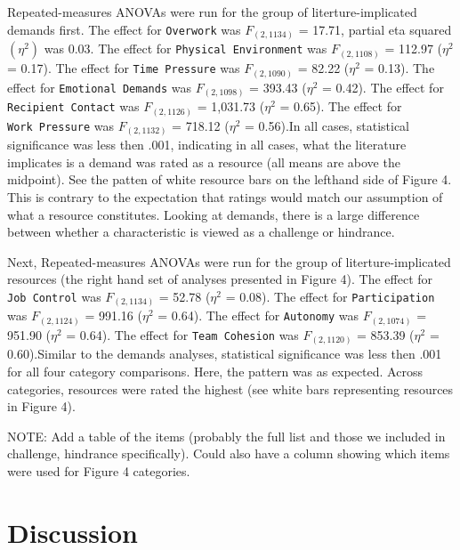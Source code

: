 \documentclass[
  english,
  man]{apa6}
\begin{document}
Repeated-measures ANOVAs were run for the group of literture-implicated demands first. The effect for \texttt{Overwork} was \(F_{(2, 1134)}\) = 17.71, partial eta squared \((\eta^2)\) was 0.03.
The effect for \texttt{Physical\ Environment} was \(F_{(2, 1108)}\) = 112.97 (\(\eta^2\) = 0.17).
The effect for \texttt{Time\ Pressure} was \(F_{(2, 1090)}\) = 82.22 (\(\eta^2\) = 0.13).
The effect for \texttt{Emotional\ Demands} was \(F_{(2, 1098)}\) = 393.43 (\(\eta^2\) = 0.42).
The effect for \texttt{Recipient\ Contact} was \(F_{(2, 1126)}\) = 1,031.73 (\(\eta^2\) = 0.65).
The effect for \texttt{Work\ Pressure} was \(F_{(2, 1132)}\) = 718.12 (\(\eta^2\) = 0.56).In all cases, statistical significance was less then .001, indicating in all cases, what the literature implicates is a demand was rated as a resource (all means are above the midpoint). See the patten of white resource bars on the lefthand side of Figure 4. This is contrary to the expectation that ratings would match our assumption of what a resource constitutes. Looking at demands, there is a large difference between whether a characteristic is viewed as a challenge or hindrance.

Next, Repeated-measures ANOVAs were run for the group of literture-implicated resources (the right hand set of analyses presented in Figure 4). The effect for \texttt{Job\ Control} was \(F_{(2, 1134)}\) = 52.78 (\(\eta^2\) = 0.08).
The effect for \texttt{Participation} was \(F_{(2, 1124)}\) = 991.16 (\(\eta^2\) = 0.64).
The effect for \texttt{Autonomy} was \(F_{(2, 1074)}\) = 951.90 (\(\eta^2\) = 0.64).
The effect for \texttt{Team\ Cohesion} was \(F_{(2, 1120)}\) = 853.39 (\(\eta^2\) = 0.60).Similar to the demands analyses, statistical significance was less then .001 for all four category comparisons. Here, the pattern was as expected. Across categories, resources were rated the highest (see white bars representing resources in Figure 4).

\newpage

NOTE: Add a table of the items (probably the full list and those we included in challenge, hindrance specifically). Could also have a column showing which items were used for Figure 4 categories.

\hypertarget{discussion}{%
\section{Discussion}\label{discussion}}
\end{document}
